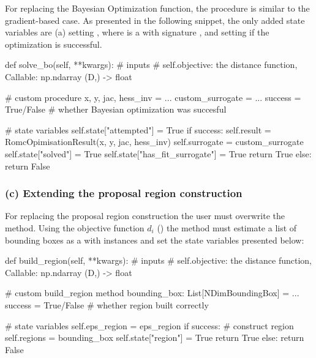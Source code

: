 \documentclass[article]{jss}
\begin{document}
For replacing the Bayesian Optimization function, the procedure is
similar to the gradient-based case. As presented in the following
snippet, the only added state variables are (a) setting
, where
 is a  with signature
, and setting
 if the optimization is
successful.

\begin{Code}
def solve_bo(self, **kwargs):
    # inputs
    # self.objective: the distance function, Callable: np.ndarray (D,) -> float

    # custom procedure
    x, y, jac, hess_inv = ...
    custom_surrogate = ...
    success = True/False # whether Bayesian optimization was succesful

    # state variables
    self.state["attempted"] = True
    if success:
        self.result = RomcOpimisationResult(x, y, jac, hess_inv)
        self.surrogate = custom_surrogate
        self.state["solved"] = True
        self.state["has_fit_surrogate"] = True
        return True
    else:
        return False
\end{Code}

\subsubsection*{(c) Extending the proposal region construction}

For replacing the proposal region construction the user must overwrite
the  method. Using the objective function \(d_i\)
() the method must estimate a list of bounding
boxes as a  with  instances and set
the state variables presented below:

\begin{Code}
def build_region(self, **kwargs):
    # inputs
    # self.objective: the distance function, Callable: np.ndarray (D,) -> float

    # custom build_region method
    bounding_box: List[NDimBoundingBox] = ...
    success = True/False # whether region built correctly

    # state variables
    self.eps_region = eps_region
    if success:
        # construct region
        self.regions = bounding_box
        self.state["region"] = True
        return True
    else:
        return False
\end{Code}
\end{document}
